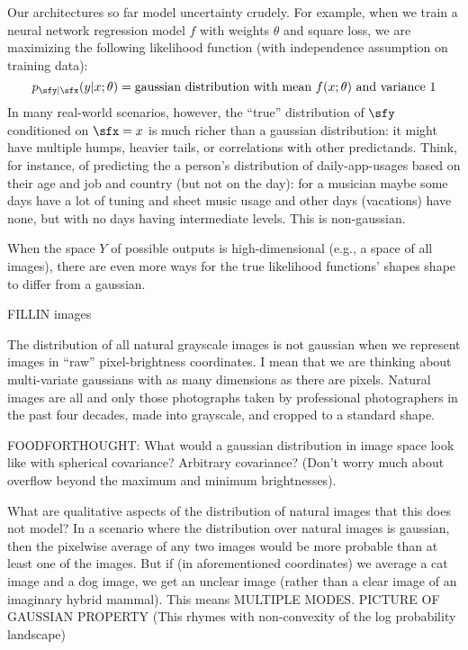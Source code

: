 %
Our architectures so far model uncertainty crudely.
For example, when we train a neural network regression model $f$ with
weights $\theta$ and square loss, we are maximizing the following
likelihood function (with independence assumption on training data):
$$
  p_{\sfy|\sfx}(y|x;\theta) = \text{gaussian distribution with mean $f(x;\theta)$ and variance $1$}
$$
In many real-world scenarios, however, the ``true'' distribution of
$\sfy$ conditioned on $\sfx=x$ is much richer than a gaussian
distribution: it might have multiple humps, heavier tails, or
correlations with other predictands.  Think, for instance, of
predicting the a person's distribution of daily-app-usages based on
their age and job and country (but not on the day): for a musician
maybe some days have a lot of tuning and sheet music usage and other
days (vacations) have none, but with no days having intermediate
levels.  This is non-gaussian.

When the space $Y$ of possible outputs
is high-dimensional (e.g., a space of all images), there are even more
ways for the true likelihood functions' shapes shape to differ from a
gaussian.

FILLIN images

The distribution of all natural grayscale images is not gaussian when
we represent images in ``raw'' pixel-brightness coordinates.  I mean
that we are thinking about multi-variate gaussians with as many
dimensions as there are pixels.  Natural images are all and only those
photographs taken by professional photographers in the past four
decades, made into grayscale, and cropped to a standard shape.
%
\par
FOODFORTHOUGHT: What would a gaussian distribution in image space look
like with spherical covariance?  Arbitrary covariance?  (Don't worry
much about overflow beyond the maximum and minimum brightnesses).
%
\par
What
are qualitative aspects of the distribution of natural images that this
does not model?
%
In a scenario where the distribution over natural images is gaussian,
then the pixelwise average of any two images would be more probable
than at least one of the images.  But if (in aforementioned
coordinates) we average a cat image and a dog image, we get an unclear
image (rather than a clear image of an imaginary hybrid mammal).
This means MULTIPLE MODES.
PICTURE OF GAUSSIAN PROPERTY
%
(This rhymes with non-convexity of the log probability landscape)

